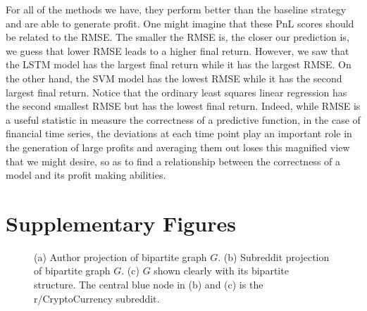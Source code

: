 \documentclass[twoside]{report}
\begin{document}
\begin{spacing}{1}
For all of the methods we have, they perform better than the baseline strategy and are able to generate profit. One might imagine that these PnL scores should be related to the RMSE. The smaller the RMSE is, the closer our prediction is, we guess that lower RMSE leads to a higher final return. However, we saw that the LSTM model has the largest final return while it has the largest RMSE. On the other hand, the SVM model has the lowest RMSE while it has the second largest final return. Notice that the ordinary least squares linear regression has the second smallest RMSE but has the lowest final return. Indeed, while RMSE is a useful statistic in measure the correctness of a predictive function, in the case of financial time series, the deviations at each time point play an important role in the generation of large profits and averaging them out loses this magnified view that we might desire, so as to find a relationship between the correctness of a model and its profit making abilities. 






















\appendix
\chapter{Supplementary Figures}\label{app:supplementary figures}

\begin{figure}[h]
\begin{minipage}{.5\linewidth}
\centering
{}
\end{minipage}%
\begin{minipage}{.5\linewidth}
\centering
{}
\end{minipage}\par\medskip
\centering
{}
\caption{(a) Author projection of bipartite graph $G$. (b) Subreddit projection of bipartite graph $G$. (c) $G$ shown clearly with its bipartite structure. The central blue node in (b) and (c) is the r/CryptoCurrency subreddit.}
\label{fig:bipartite}
\end{figure}





\end{spacing}
\end{document}
